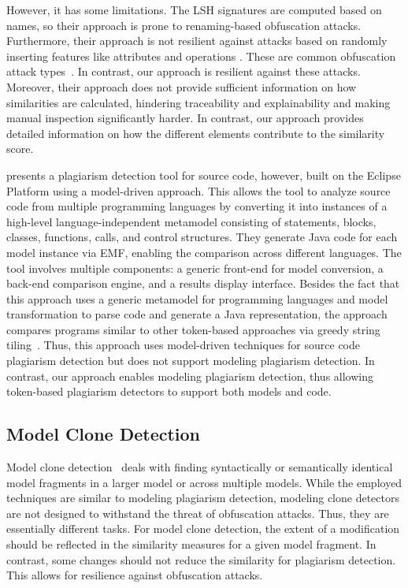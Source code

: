 However, it has some limitations.
The LSH signatures are computed based on names, so their approach is prone to renaming-based obfuscation attacks.
Furthermore, their approach is not resilient against attacks based on randomly inserting features like attributes and operations \cite{Saglam2022}.
These are common obfuscation attack types~\cite{Saglam2023, Novak2019}.
In contrast, our approach is resilient against these attacks.
Moreover, their approach does not provide sufficient information on how similarities are calculated, hindering traceability and explainability and making manual inspection significantly harder. 
In contrast, our approach provides detailed information on how the different elements contribute to the similarity score.

\citet{cornic2008} presents a plagiarism detection tool for source code, however, built on the Eclipse Platform using a model-driven approach. This allows the tool to analyze source code from multiple programming languages by converting it into instances of a high-level language-independent metamodel consisting of statements, blocks, classes, functions, calls, and control structures. They generate Java code for each model instance via EMF, enabling the comparison across different languages.
The tool involves multiple components: a generic front-end for model conversion, a back-end comparison engine, and a results display interface.
%
Besides the fact that this approach uses a generic metamodel for programming languages and model transformation to parse code and generate a Java representation, the approach compares programs similar to other token-based approaches via greedy string tiling~\cite{Wise1993}. Thus, this approach uses model-driven techniques for source code plagiarism detection but does not support modeling plagiarism detection. In contrast, our approach enables modeling plagiarism detection, thus allowing token-based plagiarism detectors to support both models and code.

\subsection{Model Clone Detection}

\noindent
Model clone detection~\cite{Shobha2021, Hammad2022} deals with finding syntactically or semantically identical model fragments in a larger model or across multiple models.
While the employed techniques are similar to modeling plagiarism detection, modeling clone detectors are not designed to withstand the threat of obfuscation attacks. Thus, they are essentially different tasks.
%
For model clone detection, the extent of a modification should be reflected in the similarity measures for a given model fragment.
In contrast, some changes should not reduce the similarity for plagiarism detection. This allows for resilience against obfuscation attacks.

